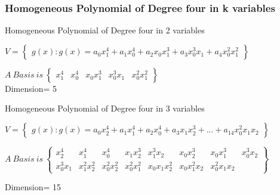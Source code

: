 \documentclass{beamer}
\newenvironment{changemargin}[2]{%
  \begin{list}{}{%
    \setlength{\topsep}{0pt}%
    \setlength{\leftmargin}{#1}%
    \setlength{\rightmargin}{#2}%
    \setlength{\listparindent}{\parindent}%
    \setlength{\itemindent}{\parindent}%
    \setlength{\parsep}{\parskip}%
  }%
  \item[]}{\end{list}}
\begin{document}
\begin{frame}
\frametitle{Homogeneous Polynomial of Degree four in k variables}
\begin{block}{}
\begin{itemize}
    \item Homogeneous Polynomial of Degree four in 2 variables
\begin{changemargin}{-4pt}{0pt}
{$V=\begin{Bmatrix}
g(x):g(x)=a_{0}x_{1}^{4}+a_{1}x_{0}^{4}+a_{2}x_{0}x_{1}^{3}+a_{3}x_{0}^{3}x_{1}+a_{4}x_{0}^{2}x_{1}^{2}
\end{Bmatrix}$}
\end{changemargin}
$A~Basis~is~\begin{Bmatrix} x_{1}^{4}& x_{0}^{4}& x_{0}x_{1}^{3}& x_{0}^{3}x_{1}& x_{0}^{2}x_{1}^{2} \end{Bmatrix}$\\
Dimension= 5
\item Homogeneous Polynomial of Degree four in 3 variables\\
\begin{changemargin}{-4pt}{0pt}
{$V=\begin{Bmatrix}
g(x):g(x)=a_{0}x_{2}^{4}+a_{1}x_{1}^{4}+a_{2}x_{0}^{4}+a_{3}x_{1}x_{2}^{3}+...+a_{14}x_{0}^{2}x_{1}x_{2}
\end{Bmatrix}$}
\end{changemargin}
\begin{changemargin}{-14pt}{0pt}
$A~Basis~is~\begin{Bmatrix} x_{2}^{4}& x_{1}^{4}& x_{0}^{4}& x_{1}x_{2}^{3}& x_{1}^{3}x_{2}& x_{0}x_{2}^{3}& x_{0}x_{1}^{3}& x_{0}^{3}x_{2}\\x_{0}^{3}x_{1}& x_{1}^{2}x_{2}^{2}& x_{0}^{2}x_{2}^{2}& x_{0}^{2}x_{1}^{2}& x_{0}x_{1}x_{2}^{2}& x_{0}x_{1}^{2}x_{2}& x_{0}^{2}x_{1}x_{2} \end{Bmatrix}$
\end{changemargin}
Dimension= 15

\end{itemize}
\end{block} 
\end{frame}
\end{document}
